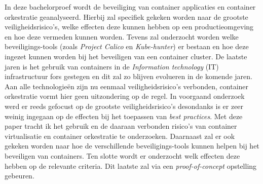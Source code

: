 In deze bachelorproef wordt de beveiliging van container applicaties en container orkestratie geanalyseerd. Hierbij zal specifiek gekeken worden naar de grootste veiligheidsrisico’s, welke effecten deze kunnen hebben op een productieomgeving en hoe deze vermeden kunnen worden. Tevens zal onderzocht worden welke beveiligings-tools (zoals \textit{Project Calico} en \textit{Kube-hunter}) er bestaan en hoe deze ingezet kunnen worden bij het beveiligen van een container cluster. De laatste jaren is het gebruik van containers in de \textit{Information technology} (IT) infrastructuur fors gestegen en dit zal zo blijven evolueren in de komende jaren. Aan alle technologieën zijn nu eenmaal veiligheidsrisico’s verbonden, container orkestratie vormt hier geen uitzondering op de regel. In voorgaand onderzoek werd er reeds gefocust op de grootste veiligheidsrisico’s desondanks is er zeer weinig ingegaan op de effecten bij het toepassen van \textit{best practices}. Met deze paper tracht ik het gebruik en de daaraan verbonden risico’s van container virtualisatie en container orkestratie te onderzoeken. Daarnaast zal er ook gekeken worden naar hoe de verschillende beveiligings-tools kunnen helpen bij het beveiligen van containers. Ten slotte wordt er onderzocht welk effecten deze hebben op de relevante criteria. Dit laatste zal via een \textit{proof-of-concept} opstelling gebeuren.
